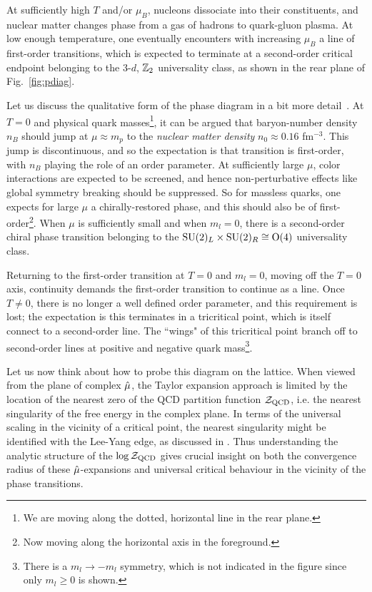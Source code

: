 At sufficiently high $T$ and/or $\mu_B$, nucleons dissociate into their constituents, 
and nuclear matter changes phase from a gas of hadrons to quark-gluon plasma.
At low enough temperature, one eventually encounters with increasing $\mu_B$ a line of 
first-order transitions, which is expected to terminate at a second-order critical 
endpoint belonging to the 3-$d$, $\mathbb{Z}_2$ universality class, as shown in the rear 
plane of Fig.~\ref{fig:pdiag}.

Let us discuss the qualitative form of the phase diagram in a bit more 
detail~\cite{halasz_phase_1998}.
At $T=0$ and physical quark masses\footnote{We are moving along the dotted,
horizontal line in the rear plane.}, it can be argued that baryon-number 
density $n_B$ should jump at
$\mu\approx m_p$ to the {\it nuclear matter density} $n_0\approx 0.16$ fm$^{-3}$. This jump is discontinuous, and
so the expectation is that transition is first-order, with $n_B$
playing the role of an order parameter.
At sufficiently large $\mu$, color interactions are expected to be screened,
and hence non-perturbative effects like global symmetry breaking should
be suppressed. So for massless quarks, one expects for large $\mu$
a chirally-restored phase, and this should also be of 
first-order\footnote{Now moving along the horizontal axis in
the foreground.}. 
When $\mu$ is sufficiently small and when $m_l=0$,
there is a second-order chiral phase transition belonging to the
$\operatorname{SU}(2)_L\times\operatorname{SU}(2)_R\cong\operatorname{\text{O}}(4)$ universality class.

Returning to the first-order transition at $T=0$ and $m_l=0$,
moving off the $T=0$ axis, continuity demands
the first-order transition to continue as a line. Once $T\neq0$, there
is no longer a well defined order parameter, and this requirement is lost;
the expectation is this terminates in a tricritical point, which is
itself connect to a second-order line. The ``wings" of this tricritical
point branch off to second-order lines at positive and negative quark
mass\footnote{There is a $m_l\to-m_l$ symmetry, which is not indicated
in the figure since only $m_l\geq0$ is shown.}.

Let us now think about how to probe this diagram on the lattice.
When viewed from the plane of complex $\hat{\mu}$, the Taylor expansion 
approach is limited by the location of the nearest zero of the QCD partition 
function $\mathcal{Z}_{\rm QCD}$, i.e. the nearest singularity of the free energy in the 
complex plane. In terms of the universal scaling in the vicinity of a critical 
point, the nearest singularity might be identified with the Lee-Yang 
edge, as discussed in . Thus understanding the analytic 
structure of the $\log\mathcal{Z}_{\rm QCD}$ gives crucial insight on both
the convergence radius of these $\hat{\mu}$-expansions and universal critical behaviour 
in the vicinity of the phase transitions.


